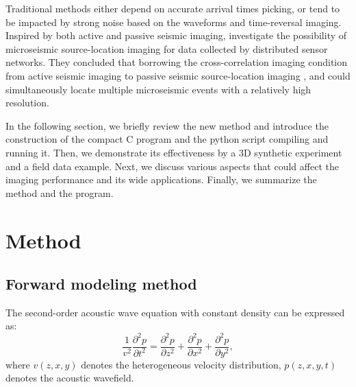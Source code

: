 Traditional methods either depend on accurate arrival times picking, or tend to be impacted by strong noise based on the waveforms and time-reversal imaging.  Inspired by both active and passive  seismic imaging, \cite{Junzhe2015} investigate the possibility of microseismic source-location imaging for data collected by distributed sensor networks. They concluded that borrowing the cross-correlation imaging condition from active  seismic imaging to passive seismic source-location imaging , and could simultaneously locate multiple microseismic events with a relatively high resolution. %

 In the following section, we briefly review the new method and introduce the construction of the compact C program and the python script compiling and running it. Then, we demonstrate its effectiveness by a 3D synthetic experiment and a field data example. Next, we discuss various aspects that could affect the imaging performance and its wide applications. Finally, we summarize the method and the program.



\section{Method}
\subsection{Forward modeling method}
The second-order acoustic wave equation with constant density can be expressed as:
\begin{equation}
\label{eq:we}
\frac{1}{v^2}\frac{\partial^2 p}{\partial t^2} = \frac{\partial^2 p}{\partial z^2} + \frac{\partial^2 p}{\partial x^2} + \frac{\partial^2 p}{\partial y^2},
\end{equation}
where $v(z,x,y)$ denotes the heterogeneous velocity distribution, $p(z,x,y,t)$ denotes the acoustic wavefield.

